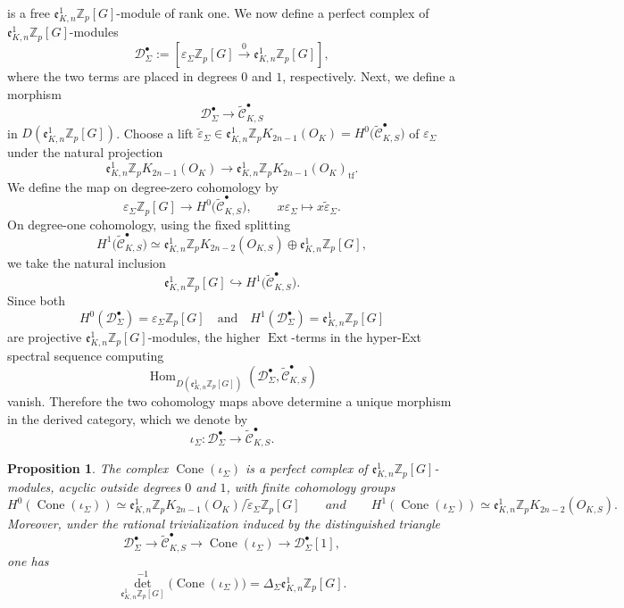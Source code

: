 \documentclass[a4paper,11pt]{article}
\newtheorem{proposition}[theorem]{Proposition}
\begin{document}
\)
is a free \(\mathfrak e^1_{K,n}\mathbb Z_p[G]\)-module of rank one.
We now define a perfect complex of \(\mathfrak e^1_{K,n}\mathbb Z_p[G]\)-modules
\[
\mathcal D_{\Sigma}^{\bullet}:=
\left[
\varepsilon_{\Sigma}\mathbb Z_p[G]
\stackrel{0}{\longrightarrow}
\mathfrak e^1_{K,n}\mathbb Z_p[G]
\right],
\]
where the two terms are placed in degrees \(0\) and \(1\), respectively. 
Next, we define a morphism
\[
\mathcal D_{\Sigma}^{\bullet}
\longrightarrow
\widetilde{\mathcal C}_{K,S}^{\bullet}
\]
in \(D(\mathfrak e^1_{K,n}\mathbb Z_p[G])\). Choose a lift
\(
\widetilde\varepsilon_{\Sigma}
\in
\mathfrak e^1_{K,n}\mathbb Z_pK_{2n-1}(O_K)
=
H^0\bigl(\widetilde{\mathcal C}_{K,S}^{\bullet}\bigr)
\)
of \(\varepsilon_{\Sigma}\) under the natural projection
\[
\mathfrak e^1_{K,n}\mathbb Z_pK_{2n-1}(O_K)
\longrightarrow
\mathfrak e^1_{K,n}\mathbb Z_pK_{2n-1}(O_K)_{\mathrm{tf}}.
\]
We define the map on degree-zero cohomology by
\[
\varepsilon_{\Sigma}\mathbb Z_p[G]
\longrightarrow
H^0\bigl(\widetilde{\mathcal C}_{K,S}^{\bullet}\bigr),
\qquad
x\varepsilon_{\Sigma}
\longmapsto
x\widetilde\varepsilon_{\Sigma}.
\]
On degree-one cohomology, using the fixed splitting
\[
H^1\bigl(\widetilde{\mathcal C}_{K,S}^{\bullet}\bigr)
\simeq
\mathfrak e^1_{K,n}\mathbb Z_pK_{2n-2}(O_{K,S})
\oplus
\mathfrak e^1_{K,n}\mathbb Z_p[G],
\]
we take the natural inclusion
\[
\mathfrak e^1_{K,n}\mathbb Z_p[G]
\hookrightarrow
H^1\bigl(\widetilde{\mathcal C}_{K,S}^{\bullet}\bigr).
\]
Since both
\[
H^0(\mathcal D_{\Sigma}^{\bullet})
=
\varepsilon_{\Sigma}\mathbb Z_p[G]
\quad\text{and}\quad
H^1(\mathcal D_{\Sigma}^{\bullet})
=
\mathfrak e^1_{K,n}\mathbb Z_p[G]
\]
are projective \(\mathfrak e^1_{K,n}\mathbb Z_p[G]\)-modules, the higher
\(\operatorname{Ext}\)-terms in the hyper-Ext spectral sequence computing
\[
\operatorname{Hom}_{D(\mathfrak e^1_{K,n}\mathbb Z_p[G])}
\left(
\mathcal D_{\Sigma}^{\bullet},
\widetilde{\mathcal C}_{K,S}^{\bullet}
\right)
\]
vanish. Therefore the two cohomology maps above determine a unique morphism in
the derived category, which we denote by
\[
\iota_{\Sigma}\colon
\mathcal D_{\Sigma}^{\bullet}
\longrightarrow
\widetilde{\mathcal C}_{K,S}^{\bullet}.
\]
\begin{proposition}
\label{prop:cone-iota-Sigma}
The complex
\(
\operatorname{Cone}(\iota_{\Sigma})
\)
is a perfect complex of
\(\mathfrak e^1_{K,n}\mathbb Z_p[G]\)-modules, acyclic outside degrees
\(0\) and \(1\), with finite cohomology groups
\[
H^0(\operatorname{Cone}(\iota_{\Sigma}))
\simeq
{
\mathfrak e^1_{K,n}\mathbb Z_pK_{2n-1}(O_K)
}/{
\widetilde\varepsilon_{\Sigma}\mathbb Z_p[G]
}
\qquad
and
\qquad
H^1(\operatorname{Cone}(\iota_{\Sigma}))
\simeq
\mathfrak e^1_{K,n}\mathbb Z_pK_{2n-2}(O_{K,S}).
\]
Moreover, under the rational trivialization induced by the distinguished
triangle
\[
\mathcal D_{\Sigma}^{\bullet}
\longrightarrow
\widetilde{\mathcal C}_{K,S}^{\bullet}
\longrightarrow
\operatorname{Cone}(\iota_{\Sigma})
\longrightarrow
\mathcal D_{\Sigma}^{\bullet}[1],
\]
one has
\[
\operatorname{det}^{-1}_{\mathfrak e^1_{K,n}\mathbb Z_p[G]}
\bigl(\operatorname{Cone}(\iota_{\Sigma})\bigr)
=
\Delta_{\Sigma}
\mathfrak e^1_{K,n}\mathbb Z_p[G].
\]
\end{proposition}
\end{document}
